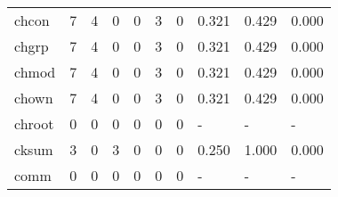 \begin{longtable}{lp{2.0cm}p{2.0cm}p{2.0cm}p{2.0cm}p{2.0cm}p{2.0cm}p{2.0cm}p{2.0cm}p{2.0cm}}
chcon     &                      7 &                                  4 &                                 0 &                                0 &                                 3 &                               0 &                                0.321 &                                  0.429 &                                0.000 \\
chgrp     &                      7 &                                  4 &                                 0 &                                0 &                                 3 &                               0 &                                0.321 &                                  0.429 &                                0.000 \\
chmod     &                      7 &                                  4 &                                 0 &                                0 &                                 3 &                               0 &                                0.321 &                                  0.429 &                                0.000 \\
chown     &                      7 &                                  4 &                                 0 &                                0 &                                 3 &                               0 &                                0.321 &                                  0.429 &                                0.000 \\
chroot    &                      0 &                                  0 &                                 0 &                                0 &                                 0 &                               0 &                                    - &                                      - &                                    - \\
cksum     &                      3 &                                  0 &                                 3 &                                0 &                                 0 &                               0 &                                0.250 &                                  1.000 &                                0.000 \\
comm      &                      0 &                                  0 &                                 0 &                                0 &                                 0 &                               0 &                                    - &                                      - &                                    - \\

\end{longtable}
